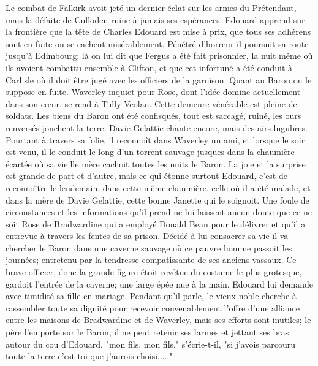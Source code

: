 {Le combat de Falkirk avoit jeté un dernier éclat sur les armes du Prétendant, mais la défaite de Culloden ruine à jamais ses espérances. Edouard apprend sur la frontière que la tête de Charles Edouard est mise à prix, que tous ses adhérens sont en fuite ou se cachent misérablement. Pénétré d'horreur il poursuit sa route jusqu'à Edimbourg; là on lui dit que Fergus a été fait\setcounter{page}{370} prisonnier, la nuit même où ils avoient combattu ensemble à Clifton, et que cet infortuné a été conduit à Carlisle où il doit être jugé avec les officiers de la garnison. Quant au Baron on le suppose en fuite. Waverley inquiet pour Rose, dont l'idée domine actuellement dans son cœur, se rend à Tully Veolan. Cette demeure vénérable est pleine de soldats. Les biens du Baron ont été confisqués, tout est saccagé, ruiné, les ours renversés jonchent la terre. Davie Gelattie chante encore, mais des airs lugubres. Pourtant à travers sa folie, il reconnoît dans Waverley un ami, et lorsque le soir est venu, il le conduit le long d'un torrent sauvage jusques dans la chaumière écartée où sa vieille mère cachoit toutes les nuits le Baron. La joie et la surprise est grande de part et d'autre, mais ce qui étonne surtout Edouard, c'est de reconnoître le lendemain, dans cette même chaumière, celle où il a été malade, et dans la mère de Davie Gelattie, cette bonne Janette qui le soignoit. Une foule de circonstances et les informations qu'il prend ne lui laissent aucun doute que ce ne soit Rose de Bradwardine qui a employé Donald Bean pour le délivrer et qu'il a entrevue à travers les fentes de sa prison. Décidé à lui consacrer sa vie il va\setcounter{page}{371} chercher le Baron dans une caverne sauvage où ce pauvre homme passoit les journées; entretenu par la tendresse compatissante de ses anciens vassaux. Ce brave officier, donc la grande figure étoit revêtue du costume le plus grotesque, gardoit l'entrée de la caverne; une large épée nue à la main. Edouard lui demande avec timidité sa fille en mariage. Pendant qu'il parle, le vieux noble cherche à rassembler toute sa dignité pour recevoir convenablement l'offre d'une alliance entre les maisons de Bradwardine et de Waverley, mais ses efforts sont inutiles; le père l'emporte sur le Baron, il ne peut retenir ses larmes et jettant ses bras autour du cou d'Edouard, "mon fils, mon fils," s'écrie-t-il, "si j'avois parcouru toute la terre c'est toi que j'aurois choisi....."
}
